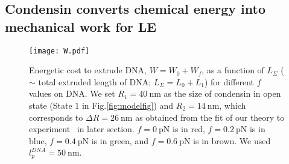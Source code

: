 \documentclass[fleqn,10pt]{wlscirep}
\newcommand{\pN}{\ \mathrm{pN}}
\newcommand{\nm}{\ \mathrm{nm}}
\newcommand{\vR}{R}
\begin{document}

\subsection*{Condensin converts chemical energy into mechanical work for LE}

\begin{figure}[]
\centering
\texttt{[image: W.pdf]}
\caption{\label{fig:delF} Energetic cost to extrude DNA, $W=W_0+W_f$, as a function of $L_\Sigma$ ($\sim$ total extruded length of DNA; $L_{\Sigma}=L_0+L_1$) for different $f$ values on DNA. 
We set $R_1 = 40 \nm$ as the size of condensin in open state (State 1 in Fig.\ref{fig:modelfig}) and $R_2=14\nm$, which corresponds to $\Delta R=26 \nm$ as obtained from the fit of our theory to experiment~\cite{ganji2018real} in later section. $f=0\pN$ is in red, $f=0.2\pN$ is in blue, $f=0.4\pN$ is in green, and $f=0.6\pN$ is in brown.  We used $l^{DNA}_p=50\nm$.
}
\end{figure}
\end{document}

